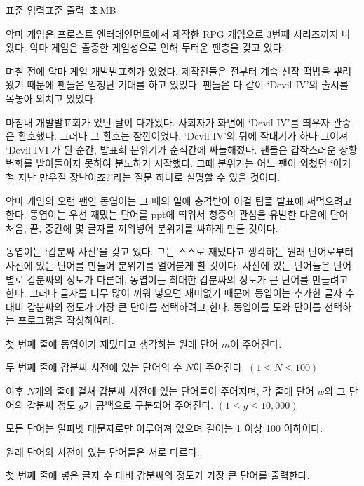 \begin{problem}{\kcpcdeviltitle}
    {표준 입력}{표준 출력}
    {\kcpcdeviltime\,초}{\kcpcdevilmemory\,MB}{}{\kcpcdevilscore}
    
    악마 게임은 프로스트 엔터테인먼트에서 제작한 RPG 게임으로 3번째 시리즈까지 나왔다. 악마 게임은 출중한 게임성으로 인해 두터운 팬층을 갖고 있다.
    
    며칠 전에 악마 게임 개발발표회가 있었다. 제작진들은 전부터 계속 신작 떡밥을 뿌려왔기 때문에 팬들은 엄청난 기대를 하고 있었다. 팬들은 다 같이 `Devil IV’의 출시를 목놓아 외치고 있었다.
    
    마침내 개발발표회가 있던 날이 다가왔다. 사회자가 화면에 `Devil IV’를 띄우자 관중은 환호했다. 그러나 그 환호는 잠깐이었다. `Devil IV’의 뒤에 작대기가 하나 그어져 `Devil IVI’가 된 순간, 발표회 분위기가 순식간에 싸늘해졌다. 팬들은 갑작스러운 상황 변화를 받아들이지 못하여 분노하기 시작했다. 그때 분위기는 어느 팬이 외쳤던 `이거 철 지난 만우절 장난이죠?’라는 질문 하나로 설명할 수 있을 것이다.
    
    악마 게임의 오랜 팬인 동엽이는 그 때의 일에 충격받아 이걸 팀플 발표에 써먹으려고 한다. 동엽이는 우선 재밌는 단어를 ppt에 띄워서 청중의 관심을 유발한 다음에 단어 처음, 끝, 중간에 몇 글자를 끼워넣어 분위기를 싸하게 만들 것이다.
    
    동엽이는 `갑분싸 사전’을 갖고 있다. 그는 스스로 재밌다고 생각하는 원래 단어로부터 사전에 있는 단어를 만들어 분위기를 얼어붙게 할 것이다. 사전에 있는 단어들은 단어별로 갑분싸의 정도가 다른데, 동엽이는 최대한 갑분싸의 정도가 큰 단어를 만들려고 한다. 그러나 글자를 너무 많이 끼워 넣으면 재미없기 때문에 동엽이는 추가한 글자 수 대비 갑분싸의 정도가 가장 큰 단어를 선택하려고 한다. 동엽이를 도와 단어를 선택하는 프로그램을 작성하여라.
    
    \InputFile
    첫 번째 줄에 동엽이가 재밌다고 생각하는 원래 단어 $ m $이 주어진다.
    
    두 번째 줄에 갑분싸 사전에 있는 단어의 수 $ N $이 주어진다. $ (1 \leq N \leq 100) $
    
    이후 $ N $개의 줄에 걸쳐 갑분싸 사전에 있는 단어들이 주어지며, 각 줄에 단어 $ w $와 그 단어의 갑분싸 정도 $ g $가 공백으로 구분되어 주어진다. $ (1 \leq g \leq 10,000) $
    
    모든 단어는 알파벳 대문자로만 이루어져 있으며 길이는 1 이상 100 이하이다.
    
    원래 단어와 사전에 있는 단어들은 서로 다르다.
    
    \OutputFile
    첫 번째 줄에 넣은 글자 수 대비 갑분싸의 정도가 가장 큰 단어를 출력한다.
    

\end{problem}
